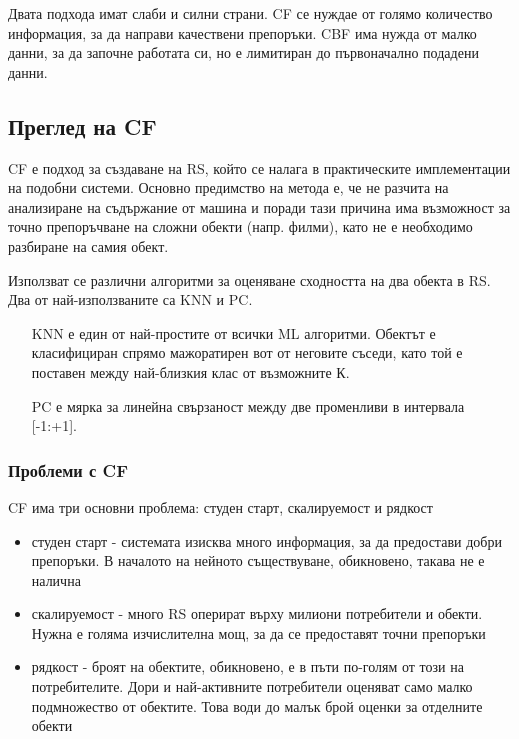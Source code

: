 	Двата подхода имат слаби и силни страни. \ac{CF} се нуждае от голямо количество информация, за да направи качествени препоръки. \ac{CBF} има нужда от малко данни, за да започне работата си, но е лимитиран до първоначално подадени данни.
	
	\subsection{Преглед на \ac{CF}}
	
		\ac{CF} е подход за създаване на \ac{RS}, който се налага в практическите имплементации на подобни системи. Основно предимство
		на метода е, че не разчита на анализиране на съдържание от машина и поради тази причина има възможност за точно препоръчване на
		сложни обекти (напр. филми), като не е необходимо разбиране на самия обект.
		
		Използват се различни алгоритми за оценяване сходността на два обекта в \ac{RS}. Два от най-използваните са \ac{KNN} и \ac{PC}.
		
		\begin{itemize}
			\item[\ac{KNN}] е един от най-простите от всички \ac{ML} алгоритми. Обектът е класифициран спрямо мажоратирен вот от неговите съседи, като той е поставен между най-близкия клас от възможните К.
			\item[\ac{PC}] е мярка за линейна свързаност между две променливи в интервала [-1:+1].
		\end{itemize}
		
	\subsubsection{Проблеми с \ac{CF}}
		
		\ac{CF} има три основни проблема: студен старт, скалируемост и рядкост
		
		\begin{itemize}
			\item студен старт - системата изисква много информация, за да предостави добри препоръки. В началото на нейното съществуване, обикновено, такава не е налична
			\item скалируемост - много \ac{RS} оперират върху милиони потребители и обекти. Нужна е голяма изчислителна мощ, за да се предоставят точни препоръки
			\item рядкост - броят на обектите, обикновено, е в пъти по-голям от този на потребителите. Дори и най-активните потребители оценяват само малко подмножество от обектите. Това води до малък брой оценки за отделните обекти
		\end{itemize}
		
